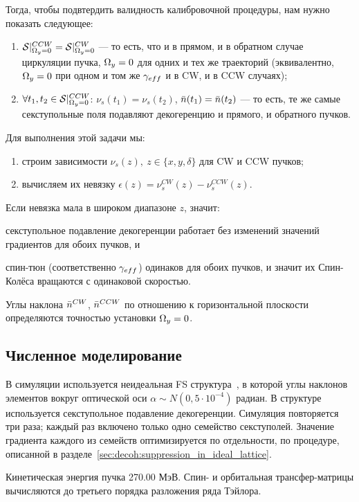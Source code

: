 Тогда, чтобы подвтердить валидность калибровочной процедуры, нам нужно показать следующее:
\begin{enumerate}
\item $\Stab*^{CCW} = \Stab*^{CW}$ --- то есть, что и в прямом, и в обратном случае циркуляции пучка,
  $\Omega_y = 0$ для одних и тех же траекторий (эквивалентно, $\Omega_y=0$ при одном и том же $\g*$ и в CW, и в CCW
  случаях);
\item $\forall t_1,t_2\in\Stab*^{CCW}$: $\nu_s(t_1) = \nu_s(t_2)$, $\bar n(t_1) = \bar n(t_2)$ ---
  то есть, те же самые секступольные поля подавляют декогеренцию и прямого, и обратного пучков.
\end{enumerate}

Для выполнения этой задачи мы:
\begin{enumerate}
\item строим зависимости $\nu_s(z),~z\in\{x,y,\delta\}$ для CW и CCW пучков;
\item вычисляем их невязку $\epsilon(z) = \nu_s^{CW}(z) - \nu_s^{CCW}(z)$.
\end{enumerate}

Если невязка мала в широком диапазоне $z$, значит:
\begin{enumerate*}[1)]
\item секступольное подавление декогеренции работает без изменений значений градиентов для обоих пучков, и
\item спин-тюн (соответственно $\g*$) одинаков для обоих пучков, и значит их Спин-Колёса
вращаются с одинаковой скоростью.
\end{enumerate*}

Углы наклона $\bar n^{CW}$, $\bar n^{CCW}$ по отношению к горизонтальной плоскости определяются точностью установки
$\Omega_y=0$.

\subsection{Численное моделирование}
В симуляции используется неидеальная FS структура~\cite{Senichev:Lattices}, в которой углы наклонов элементов
вокруг оптической оси $\alpha \sim N(0, 5\cdot10^{-4})$ радиан. В структуре используется секступольное
подавление декогеренции. Симуляция повторяется три раза; каждый раз
включено только одно семейство секступолей. Значение градиента каждого
из семейств оптимизируется по отдельности, по процедуре, описанной
в разделе~\ref{sec:decoh:suppression_in_ideal_lattice}.

Кинетическая энергия пучка 270.00 МэВ.
Спин- и орбитальная трансфер-матрицы вычисляются до третьего порядка разложения ряда Тэйлора.


